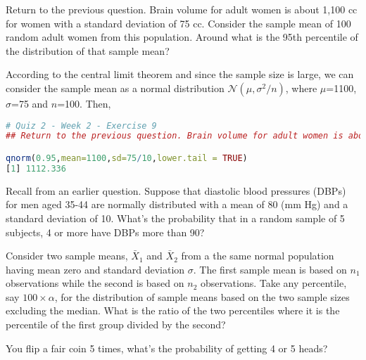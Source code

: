 \documentclass{homework}
\begin{document}
\begin{tcolorbox}[title=Question 9]
Return to the previous question. Brain volume for adult women is about 1,100 cc for women with a standard deviation of 75 cc. Consider the sample mean of 100 random adult women from this population. Around what is the 95th percentile of the distribution of that sample mean?
\end{tcolorbox}

According to the central limit theorem and since the sample size is large, we can consider the sample mean as a normal distribution $\mathcal{N}(\mu,\sigma^2/n)$, where $\mu$=1100, $\sigma$=75 and $n$=100. Then,

\begin{lstlisting}[language=R]
# Quiz 2 - Week 2 - Exercise 9
## Return to the previous question. Brain volume for adult women is about 1,100 cc for women with a standard deviation of 75 cc. Consider the sample mean of 100 random adult women from this population. Around what is the 95th percentile of the distribution of that sample mean?

qnorm(0.95,mean=1100,sd=75/10,lower.tail = TRUE)
[1] 1112.336
\end{lstlisting}

\begin{tcolorbox}[title=Question 10]
Recall from an earlier question. Suppose that diastolic blood pressures (DBPs) for men aged 35-44 are normally distributed with a mean of 80 (mm Hg) and a standard deviation of 10.  What's the probability that in a random sample of 5 subjects, 4 or more have DBPs more than 90?
\end{tcolorbox}



\begin{tcolorbox}[title=Question 11]
Consider two sample means, $\bar X_1$ and $\bar X_2$ from a the same normal population having mean zero and standard deviation $\sigma$.  The first sample mean is based on $n_1$ observations while the second is based on $n_2$ observations. Take any percentile, say $100 \times \alpha$,  for the distribution of sample means based on the two sample sizes excluding the median. What is the ratio of the two percentiles where it is the percentile of the first group divided by the second?
\end{tcolorbox}

\begin{tcolorbox}[title=Question 12]
You flip a fair coin 5 times, what's the probability of getting 4 or 5 heads?
\end{tcolorbox}
\end{document}
